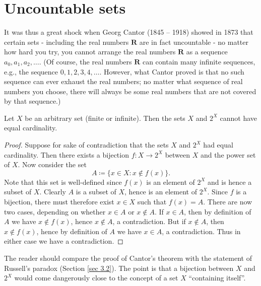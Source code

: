 \section{Uncountable sets}\label{sec 8.3}

\begin{note}
It was thus a great shock when Georg Cantor (1845 -- 1918) showed in 1873 that certain sets
- including the real numbers \(\mathbf{R}\) are in fact uncountable -
no matter how hard you try, you cannot arrange the real numbers \(\mathbf{R}\) as a sequence \(a_0, a_1, a_2, \dots\).
(Of course, the real numbers \(\mathbf{R}\) can contain many infinite sequences, e.g., the sequence \(0, 1, 2, 3, 4, \dots\).
However, what Cantor proved is that no such sequence can ever exhaust the real numbers;
no matter what sequence of real numbers you choose, there will always be some real numbers that are not covered by that sequence.)
\end{note}

\begin{theorem}\label{8.3.1}
Let \(X\) be an arbitrary set (finite or infinite).
Then the sets \(X\) and \(2^X\) cannot have equal cardinality.
\end{theorem}

\begin{proof}
Suppose for sake of contradiction that the sets \(X\) and \(2^X\) had equal cardinality.
Then there exists a bijection \(f : X \to 2^X\) between \(X\) and the power set of \(X\).
Now consider the set
\[
    A \coloneqq \{x \in X : x \notin f(x)\}.
\]
Note that this set is well-defined since \(f(x)\) is an element of \(2^X\) and is hence a subset of \(X\).
Clearly \(A\) is a subset of \(X\), hence is an element of \(2^X\).
Since \(f\) is a bijection, there must therefore exist \(x \in X\) such that \(f(x) = A\).
There are now two cases, depending on whether \(x \in A\) or \(x \notin A\).
If \(x \in A\), then by definition of \(A\) we have \(x \notin f(x)\), hence \(x \notin A\), a contradiction.
But if \(x \notin A\), then \(x \notin f(x)\), hence by definition of \(A\) we have \(x \in A\), a contradiction.
Thus in either case we have a contradiction.
\end{proof}

\begin{remark}\label{8.3.2}
The reader should compare the proof of Cantor's theorem with the statement of Russell's paradox (Section \ref{sec 3.2}).
The point is that a bijection between \(X\) and \(2^X\) would come dangerously close to the concept of a set \(X\) ``containing itself''.
\end{remark}

